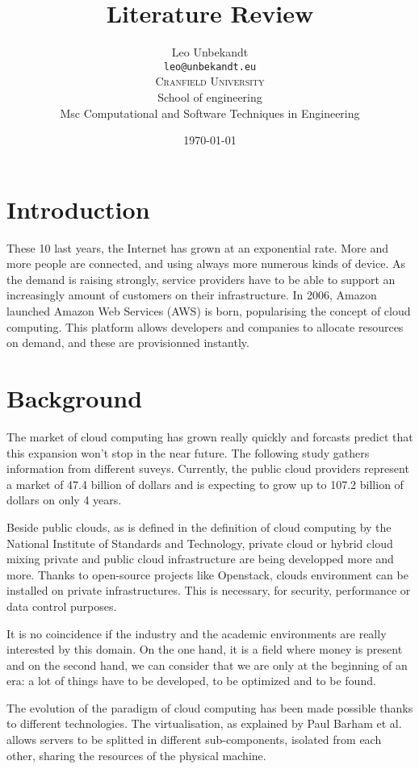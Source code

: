 \documentclass[a4paper,11pt]{article}
\author{Leo Unbekandt \\
 \texttt{leo@unbekandt.eu} \vspace{1em} \\
 \textsc{Cranfield University} \\
 School of engineering \\
 Msc Computational and Software Techniques in Engineering
}
\title{Literature Review}
\date{\today}
\begin{document}
\maketitle
\tableofcontents

\section*{Introduction}

These 10 last years, the Internet has grown at an exponential rate. More and
more people are connected, and using always more numerous kinds of device.
As the demand is raising strongly, service providers have to be able to support
an increasingly amount of customers on their infrastructure. In 2006, Amazon
launched Amazon Web Services (AWS) is born, popularising the concept of cloud
computing. This platform allows developers and companies to allocate resources
on demand, and these are provisionned instantly.

\section{Background}

The market of cloud computing has grown really quickly and forcasts predict
that this expansion won't stop in the near future. The following study gathers
information from different suveys\cite{website:cloudcomputingmarket}.
Currently, the public cloud providers represent a market of 47.4 billion of
dollars and is expecting to grow up to 107.2 billion of dollars on only 4
years.

Beside public clouds, as is defined in the definition of cloud
computing\cite{nistcloudcomputing} by the National Institute of Standards and
Technology, private cloud or hybrid cloud mixing private and public cloud
infrastructure are being developped more and more.  Thanks to open-source
projects like Openstack\cite{website:openstack}, clouds environment can be
installed on private infrastructures. This is necessary, for security,
performance or data control purposes.

It is no coincidence if the industry and the academic environments are really
interested by this domain. On the one hand, it is a field where money is
present and on the second hand, we can consider that we are only at the
beginning of an era: a lot of things have to be developed, to be optimized and
to be found.

The evolution of the paradigm of cloud computing has been made possible thanks
to different technologies. The virtualisation, as explained by Paul Barham et
al.\cite{virtualisation} allows servers to be splitted in different
sub-components, isolated from each other, sharing the resources of the physical
machine. 
\end{document}
